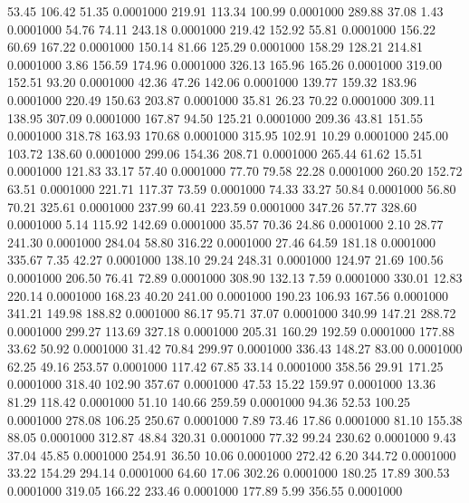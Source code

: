   53.45  106.42   51.35   0.0001000
 219.91  113.34  100.99   0.0001000
 289.88   37.08    1.43   0.0001000
  54.76   74.11  243.18   0.0001000
 219.42  152.92   55.81   0.0001000
 156.22   60.69  167.22   0.0001000
 150.14   81.66  125.29   0.0001000
 158.29  128.21  214.81   0.0001000
   3.86  156.59  174.96   0.0001000
 326.13  165.96  165.26   0.0001000
 319.00  152.51   93.20   0.0001000
  42.36   47.26  142.06   0.0001000
 139.77  159.32  183.96   0.0001000
 220.49  150.63  203.87   0.0001000
  35.81   26.23   70.22   0.0001000
 309.11  138.95  307.09   0.0001000
 167.87   94.50  125.21   0.0001000
 209.36   43.81  151.55   0.0001000
 318.78  163.93  170.68   0.0001000
 315.95  102.91   10.29   0.0001000
 245.00  103.72  138.60   0.0001000
 299.06  154.36  208.71   0.0001000
 265.44   61.62   15.51   0.0001000
 121.83   33.17   57.40   0.0001000
  77.70   79.58   22.28   0.0001000
 260.20  152.72   63.51   0.0001000
 221.71  117.37   73.59   0.0001000
  74.33   33.27   50.84   0.0001000
  56.80   70.21  325.61   0.0001000
 237.99   60.41  223.59   0.0001000
 347.26   57.77  328.60   0.0001000
   5.14  115.92  142.69   0.0001000
  35.57   70.36   24.86   0.0001000
   2.10   28.77  241.30   0.0001000
 284.04   58.80  316.22   0.0001000
  27.46   64.59  181.18   0.0001000
 335.67    7.35   42.27   0.0001000
 138.10   29.24  248.31   0.0001000
 124.97   21.69  100.56   0.0001000
 206.50   76.41   72.89   0.0001000
 308.90  132.13    7.59   0.0001000
 330.01   12.83  220.14   0.0001000
 168.23   40.20  241.00   0.0001000
 190.23  106.93  167.56   0.0001000
 341.21  149.98  188.82   0.0001000
  86.17   95.71   37.07   0.0001000
 340.99  147.21  288.72   0.0001000
 299.27  113.69  327.18   0.0001000
 205.31  160.29  192.59   0.0001000
 177.88   33.62   50.92   0.0001000
  31.42   70.84  299.97   0.0001000
 336.43  148.27   83.00   0.0001000
  62.25   49.16  253.57   0.0001000
 117.42   67.85   33.14   0.0001000
 358.56   29.91  171.25   0.0001000
 318.40  102.90  357.67   0.0001000
  47.53   15.22  159.97   0.0001000
  13.36   81.29  118.42   0.0001000
  51.10  140.66  259.59   0.0001000
  94.36   52.53  100.25   0.0001000
 278.08  106.25  250.67   0.0001000
   7.89   73.46   17.86   0.0001000
  81.10  155.38   88.05   0.0001000
 312.87   48.84  320.31   0.0001000
  77.32   99.24  230.62   0.0001000
   9.43   37.04   45.85   0.0001000
 254.91   36.50   10.06   0.0001000
 272.42    6.20  344.72   0.0001000
  33.22  154.29  294.14   0.0001000
  64.60   17.06  302.26   0.0001000
 180.25   17.89  300.53   0.0001000
 319.05  166.22  233.46   0.0001000
 177.89    5.99  356.55   0.0001000
